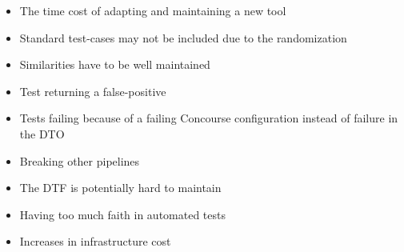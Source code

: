 \pagebreak

\begin{itemize}
    \item The time cost of adapting and maintaining a new tool
    \item Standard test-cases may not be included due to the randomization
    \item Similarities have to be well maintained
    \item Test returning a false-positive
    \item Tests failing because of a failing Concourse configuration instead of failure in the DTO
    \item Breaking other pipelines
    \item The DTF is potentially hard to maintain
    \item Having too much faith in automated tests
    \item Increases in infrastructure cost
\end{itemize}